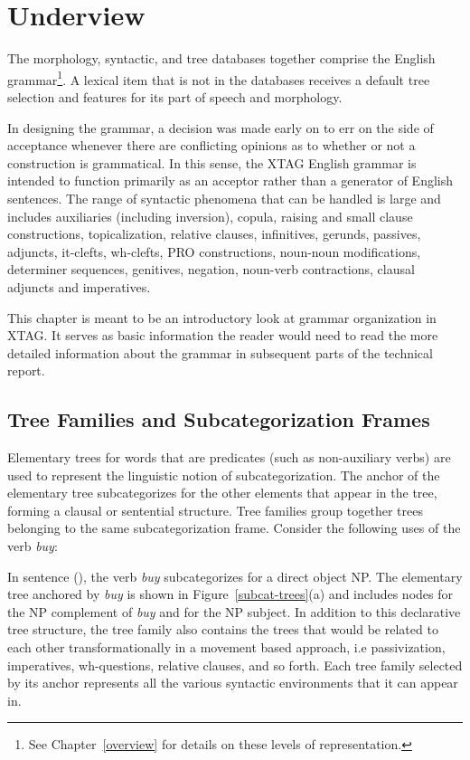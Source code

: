 \chapter{Underview}
\label{underview}

The morphology, syntactic, and tree databases together comprise the
English grammar\footnote{ See Chapter~\ref{overview} for details on
these levels of representation. }.  A lexical item that is not in the
databases receives a default tree selection and features for its part
of speech and morphology.  

In designing the grammar, a decision was made early on to err on the
side of acceptance whenever there are conflicting opinions as to
whether or not a construction is grammatical.  In this sense, the XTAG
English grammar is intended to function primarily as an acceptor
rather than a generator of English sentences.  The range of syntactic
phenomena that can be handled is large and includes auxiliaries
(including inversion), copula, raising and small clause constructions,
topicalization, relative clauses, infinitives, gerunds, passives,
adjuncts, it-clefts, wh-clefts, PRO constructions, noun-noun
modifications, determiner sequences, genitives, negation, noun-verb
contractions, clausal adjuncts and imperatives.

This chapter is meant to be an introductory look at grammar
organization in XTAG. It serves as basic information the reader would
need to read the more detailed information about the grammar in
subsequent parts of the technical report.

\section{Tree Families and Subcategorization Frames}
\label{subcat-frames}

Elementary trees for words that are predicates (such as non-auxiliary
verbs) are used to represent the linguistic notion of
subcategorization.  The anchor of the elementary tree subcategorizes
for the other elements that appear in the tree, forming a clausal or
sentential structure.  Tree families group together trees belonging to
the same subcategorization frame.  Consider the following uses of the
verb {\it buy}:


In sentence (), the verb {\it buy} subcategorizes for a direct
object NP.  The elementary tree anchored by {\it buy} is shown in
Figure~\ref{subcat-trees}(a) and includes nodes for the NP complement
of {\it buy} and for the NP subject.  In addition to this declarative
tree structure, the tree family also contains the trees that would be
related to each other transformationally in a movement based approach,
i.e passivization, imperatives, wh-questions, relative clauses, and so
forth.  Each tree family selected by its anchor represents all the
various syntactic environments that it can appear in.


